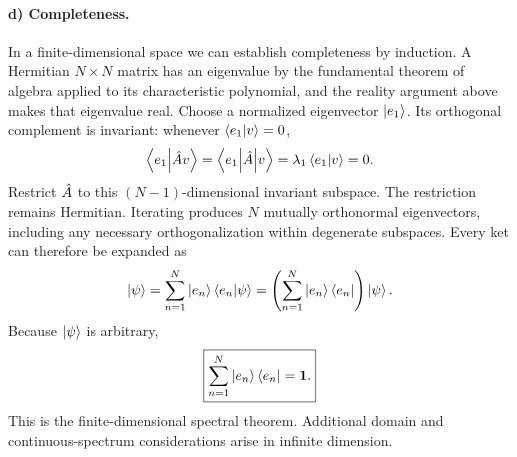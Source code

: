 \paragraph{d) Completeness.}
In a finite-dimensional space we can establish completeness by induction.
A Hermitian $N\times N$ matrix has an eigenvalue by the fundamental
theorem of algebra applied to its characteristic polynomial, and
the reality argument above makes that eigenvalue real.
Choose a normalized eigenvector $\left|e_1\right\rangle$.
Its orthogonal complement is invariant: whenever
$\left\langle e_1\middle|v\right\rangle=0$,
\begin{equation}
\left\langle e_1\middle|\hat{A} v\right\rangle
=\left\langle e_1\middle|\hat{A}\middle|v\right\rangle
=\lambda_1\left\langle e_1\middle|v\right\rangle=0.
\end{equation}
Restrict $\hat{A}$ to this $(N-1)$-dimensional invariant subspace.
The restriction remains Hermitian. Iterating produces $N$ mutually
orthonormal eigenvectors, including any necessary orthogonalization
within degenerate subspaces.
Every ket can therefore be expanded as
\begin{equation}
\left|\psi\right\rangle=\sum_{n=1}^N\left|e_n\right\rangle\left\langle e_n\middle|\psi\right\rangle
=\left(\sum_{n=1}^N\left|e_n\right\rangle\left\langle e_n\right|\right)\left|\psi\right\rangle.
\end{equation}
Because $\left|\psi\right\rangle$ is arbitrary,
\begin{equation}
\boxed{\sum_{n=1}^N\left|e_n\right\rangle\left\langle e_n\right|=\mathbf1.}
\end{equation}
This is the finite-dimensional spectral theorem. Additional
domain and continuous-spectrum considerations arise in infinite
dimension.

